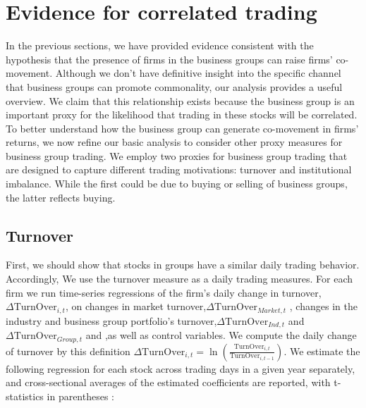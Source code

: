 \section{{Evidence for correlated trading} }


	In the previous sections, we have provided evidence consistent with the hypothesis that the presence of firms in the business groups can raise firms' co-movement. Although we don't have definitive insight into the specific channel that business groups can promote commonality, our analysis provides a useful overview.
	We claim that this relationship exists because the business group is an important proxy for the likelihood that trading in these stocks will be correlated. To better understand how the business group can generate co-movement in firms' returns, we now refine our basic analysis to consider other proxy measures for business group trading.
	We employ two proxies for business group trading that are designed to capture different trading motivations: turnover and institutional imbalance. While the first could be due to buying or selling of business groups, the latter reflects buying.

		\captionsetup[subtable]{labelformat=parens}
			\renewcommand{\thesubtable}{\Alph{subtable}}

\subsection{{Turnover}}


	First, we should show that stocks in groups have a similar daily trading behavior. Accordingly, We use the turnover measure as a daily trading measures. For each firm we run time-series regressions of the firm's daily change in turnover, $ \Delta \text{TurnOver}_{i,t} $, on changes in market turnover,$ \Delta\text{TurnOver}_{Market,t}   $ , changes in the industry and business group portfolio's turnover,$ \Delta\text{TurnOver}_{Ind,t} $ and  $\Delta \text{TurnOver}_{Group,t} $ and  ,as well as control variables.
	We compute the daily change of turnover by this definition $ \Delta \text{TurnOver}_{i,t} = \ln(\frac{\text{TurnOver}_{i,t}}{\text{TurnOver}_{i,t-1}}) $. 
	We estimate the following regression for each stock across trading days in a given year separately, and cross-sectional averages of the estimated coefficients are reported, with t-statistics in parentheses :
	
